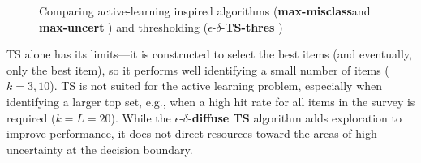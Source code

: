 \documentclass[nonblindrev]{informs3}
\newcommand{\mismin}{\textbf{max-misclass}}
\newcommand{\edts}{$\epsilon$-$\delta$-\textbf{diffuse TS} }
\newcommand{\edtsthres}{$\epsilon$-$\delta$-\textbf{TS-thres} }
\newcommand{\uncert}{\textbf{max-uncert} }
\begin{document}
\begin{figure}%
    \caption{Comparing active-learning inspired algorithms (\mismin and \uncert) and thresholding (\edtsthres)}%
    \label{fig:mismin_uncert_thresh_ts_hit10}%
 	\begin{center}
    \qquad
	\end{center}
\end{figure}



TS alone has its limits---it is constructed to select the best items (and eventually, only the best item), so it performs well identifying a small number of items ($k=3,10$). TS is not suited for the active learning problem, especially when identifying a larger top set, e.g., when a high hit rate for all items in the survey is required ($k=L=20$). While the \edts algorithm adds exploration to improve performance, it does not direct resources toward the areas of high uncertainty at the decision boundary.
\end{document}
